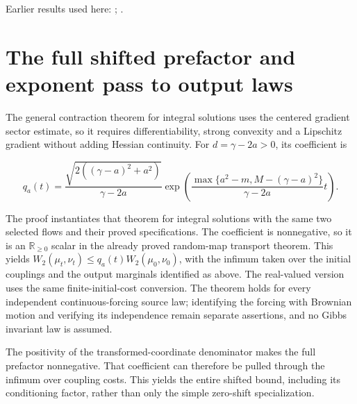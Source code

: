 \documentclass[11pt,a4paper]{article}
\begin{document}
Earlier results used here: \cite[Section~3.17.3]{LangevinLean2026ULASC}; \cite[Section~3.17.4]{LangevinLean2026ULASC}.

\section{\texorpdfstring{The full shifted prefactor and exponent pass to output laws}{The full shifted prefactor and exponent pass to output laws}}


The general contraction theorem for integral solutions uses the centered gradient sector estimate, so it requires differentiability, strong convexity and a Lipschitz gradient without adding Hessian continuity. For \(d=\gamma-2a>0\), its coefficient is

\[q_a(t)=\frac{\sqrt{2((\gamma-a)^2+a^2)}}{\gamma-2a}
\exp\!\left(\frac{\max\{a^2-m,M-(\gamma-a)^2\}}{\gamma-2a}t\right).\]

The proof instantiates that theorem for integral solutions with the same two selected flows and their proved specifications. The coefficient is nonnegative, so it is an \(\mathbb R_{\ge0}\) scalar in the already proved random-map transport theorem. This yields \(W_2(\mu_t,\nu_t)\le q_a(t)W_2(\mu_0,\nu_0)\), with the infimum taken over the initial couplings and the output marginals identified as above. The real-valued version uses the same finite-initial-cost conversion. The theorem holds for every independent continuous-forcing source law; identifying the forcing with Brownian motion and verifying its independence remain separate assertions, and no Gibbs invariant law is assumed.



The positivity of the transformed-coordinate denominator makes the full prefactor nonnegative. That coefficient can therefore be pulled through the infimum over coupling costs. This yields the entire shifted bound, including its conditioning factor, rather than only the simple zero-shift specialization.
\end{document}
